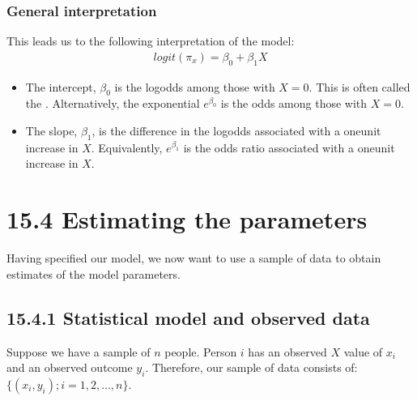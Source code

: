 \documentclass[letterpaper,10pt,english]{jupyterBook}
\begin{document}
\subsubsection{General interpretation}
\label{\detokenize{15.d. Logistic Regression:general-interpretation}}
\sphinxAtStartPar
This leads us to the following interpretation of the model:
\begin{equation*}
\begin{split}
logit(\pi_x) = \beta_0 + \beta_1 X
\end{split}
\end{equation*}\begin{itemize}
\item {} 
\sphinxAtStartPar
The intercept, \(\beta_0\) is the log\sphinxhyphen{}odds among those with \(X=0\). This is often called the . Alternatively, the exponential \(e^{\beta_0}\) is the odds among those with \(X=0\).

\item {} 
\sphinxAtStartPar
The slope, \(\beta_1\), is the difference in the log\sphinxhyphen{}odds associated with a one\sphinxhyphen{}unit increase in \(X\). Equivalently, \(e^{\beta_1}\) is the odds ratio associated with a one\sphinxhyphen{}unit increase in \(X\).

\end{itemize}


\section{15.4 Estimating the parameters}
\label{\detokenize{15.e. Logistic Regression:estimating-the-parameters}}\label{\detokenize{15.e. Logistic Regression::doc}}
\sphinxAtStartPar
Having specified our model, we now want to use a sample of data to obtain estimates of the model parameters.


\subsection{15.4.1 Statistical model and observed data}
\label{\detokenize{15.e. Logistic Regression:statistical-model-and-observed-data}}
\sphinxAtStartPar
{} Suppose we have a sample of \(n\) people. Person \(i\) has an observed \(X\) value of \(x_i\) and an observed outcome \(y_i\). Therefore, our sample of data consists of: \(\{ (x_i, y_i); i=1,2,...,n\}\).
\end{document}

